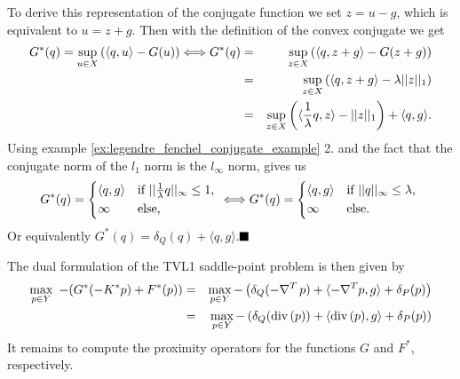 \documentclass{scrreprt}
\newcommand{\qed}{$\hfill\blacksquare$}
\newenvironment{proof}[1][Proof]{\begin{trivlist}
\item[\hskip \labelsep {\bfseries #1}]}{\end{trivlist}}
\begin{document}
                \begin{proof}
                    To derive this representation of the conjugate function we set $z = u - g$, which is equivalent to $u = z + g$. Then with the definition of the convex conjugate we get
                        \begin{eqnarray}
                            G^{\ast}(q) = \sup_{u \in X} \left( \langle q, u \rangle - G(u) \right) \Longleftrightarrow G^{\ast}(q) &=& \sup_{z \in X} \left( \langle q, z + g \rangle - G(z + g) \right) \notag \\
                            &=& \sup_{z \in X} \left( \langle q, z + g \rangle - \lambda ||z||_{1} \right) \notag \\
                            &=& \sup_{z \in X} \left( \langle \frac{1}{\lambda} q, z \rangle - ||z||_{1} \right) + \langle q, g \rangle. \notag
                        \end{eqnarray}
                    Using example \ref{ex:legendre_fenchel_conjugate_example} 2. and the fact that the conjugate norm of the $l_{1}$ norm is the $l_{\infty}$ norm, gives us
                        $$
                            G^{\ast}(q) =
                                \begin{dcases*}
                                    \langle q, g \rangle & \textnormal{if $||\frac{1}{\lambda}q||_{\infty} \le 1$,} \\
                                    \infty & \textnormal{else},
                                \end{dcases*} \Longleftrightarrow
                            G^{\ast}(q) =
                                \begin{dcases*}
                                    \langle q, g \rangle & \textnormal{if $||q||_{\infty} \le \lambda$,} \\
                                    \infty & \textnormal{else}.
                                \end{dcases*}
                        $$
                    Or equivalently $G^{\ast}(q) = \delta_{Q}(q) + \langle q, g \rangle$.\qed
                \end{proof}
            The dual formulation of the TVL1 saddle-point problem is then given by
                \begin{eqnarray}
                    \max_{p \in Y}\,\, -(G^{\ast}(-K^{\ast}p) + F^{\ast}(p)) &=& \max_{p \in Y} -\left( \delta_{Q}(-\nabla^{T}\,p) + \langle -\nabla^{T}p, g \rangle + \delta_{P}(p) \right) \notag \\
                    &=& \max_{p \in Y} -\left( \delta_{Q}(\textnormal{div}\,(p)) + \langle \textnormal{div}\,(p), g \rangle + \delta_{P}(p) \right)
                \end{eqnarray}
            It remains to compute the proximity operators for the functions $G$ and $F^{\ast}$, respectively.
        
\end{document}
